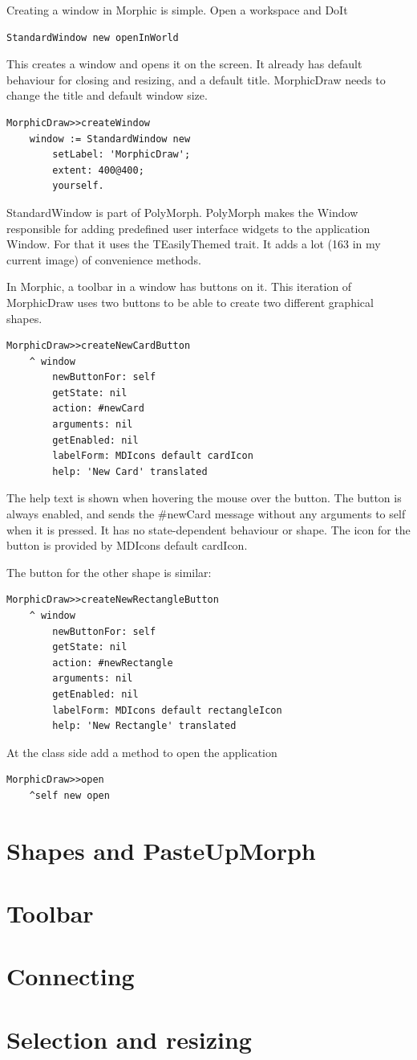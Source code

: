 \documentclass[10pt]{article}   	%
\begin{document}
Creating a window in Morphic is simple. Open a workspace and DoIt
\begin{verbatim}
StandardWindow new openInWorld 
\end{verbatim}
This creates a window and opens it on the screen. It already has default
behaviour for closing and resizing, and a default title. MorphicDraw
needs to change the title and default window size.

\begin{verbatim}
MorphicDraw>>createWindow
    window := StandardWindow new
        setLabel: 'MorphicDraw';
        extent: 400@400;
        yourself.
\end{verbatim}

StandardWindow is part of PolyMorph. PolyMorph makes the 
Window responsible for adding predefined user interface widgets
to the application Window. For that it uses the TEasilyThemed 
trait. It adds a lot (163 in my current image) of convenience methods.

In Morphic, a toolbar in a window has buttons on it. This iteration of
MorphicDraw uses two buttons to be able to create two different 
graphical shapes.

\begin{verbatim}
MorphicDraw>>createNewCardButton
    ^ window
        newButtonFor: self
        getState: nil
        action: #newCard
        arguments: nil
        getEnabled: nil
        labelForm: MDIcons default cardIcon
        help: 'New Card' translated
\end{verbatim}
The help text is shown when hovering the mouse over the button.
The button is always enabled, and sends the \#newCard message 
without any arguments to self when it is pressed. It has no 
state-dependent behaviour or shape. The icon for the button
is provided by MDIcons default cardIcon.

The button for the other shape is similar:
\begin{verbatim}
MorphicDraw>>createNewRectangleButton
    ^ window
        newButtonFor: self
        getState: nil
        action: #newRectangle
        arguments: nil
        getEnabled: nil
        labelForm: MDIcons default rectangleIcon
        help: 'New Rectangle' translated
\end{verbatim}

At the class side add a method to open the application

\begin{verbatim}
MorphicDraw>>open
    ^self new open
\end{verbatim}

\section{Shapes and PasteUpMorph}

\section{Toolbar}
\section{Connecting}



\section{Selection and resizing}
\end{document}
